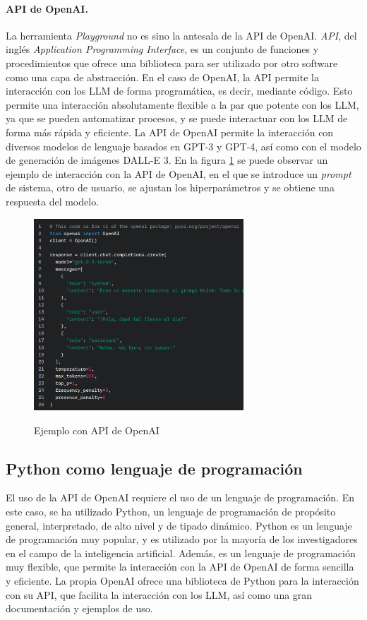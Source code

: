         \paragraph{API de OpenAI.} La herramienta \emph{Playground} no es sino la antesala de la API de OpenAI. \emph{API}, del inglés \emph{Application Programming Interface}, es un conjunto de funciones y procedimientos que ofrece una biblioteca para ser utilizado por otro software como una capa de abstracción. En el caso de OpenAI, la API permite la interacción con los LLM de forma programática, es decir, mediante código. Esto permite una interacción absolutamente flexible a la par que potente con los LLM, ya que se pueden automatizar procesos, y se puede interactuar con los LLM de forma más rápida y eficiente. La API de OpenAI permite la interacción con diversos modelos de lenguaje basados en GPT-3 y GPT-4, así como con el modelo de generación de imágenes DALL-E 3. En la figura \ref{fig:api} se puede observar un ejemplo de interacción con la API de OpenAI, en el que se introduce un \emph{prompt} de sistema, otro de usuario, se ajustan los hiperparámetros y se obtiene una respuesta del modelo.

        \begin{figure}[h]
            \caption[Ejemplo con API de OpenAI]{Ejemplo con API de OpenAI}
            \centering
            \includegraphics[width=0.7\textwidth]{./figuras/ejemplo_API.png}
            \source{\propio}
            \label{fig:api}
        \end{figure}

    \subsection{Python como lenguaje de programación}
    El uso de la API de OpenAI requiere el uso de un lenguaje de programación. En este caso, se ha utilizado Python, un lenguaje de programación de propósito general, interpretado, de alto nivel y de tipado dinámico. Python es un lenguaje de programación muy popular, y es utilizado por la mayoría de los investigadores en el campo de la inteligencia artificial. Además, es un lenguaje de programación muy flexible, que permite la interacción con la API de OpenAI de forma sencilla y eficiente. La propia OpenAI ofrece una biblioteca de Python para la interacción con su API, que facilita la interacción con los LLM, así como una gran documentación y ejemplos de uso. 

